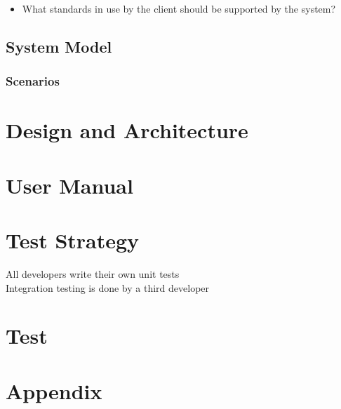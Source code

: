 \documentclass{report}
\begin{document}
\begin{itemize}
\item {\color{red}What standards in use by the client should be supported by the system?}
\end{itemize}
\section{System Model}

\subsection{Scenarios}

\chapter{Design and Architecture}

\chapter{User Manual}

\chapter{Test Strategy}
All developers write their own unit tests \\
Integration testing is done by a third developer

\chapter{Test}

\chapter{Appendix}
\end{document}
